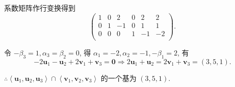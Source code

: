 \documentclass[color=black,device=normal,lang=cn,mode=geye]{elegantnote}
\begin{document}
\begin{solution}
    系数矩阵作行变换得到
    \[\begin{pmatrix}
        1 & 0 & 2  & 0 & 2  & 2 \\
        0 & 1 & -1 & 0 & 1  & 1 \\
        0 & 0 & 0  & 1 & -1 & -2 \\
    \end{pmatrix}.\]

    令 $-\beta_3=1,\alpha_3=\beta_2=0$, 得 $\alpha_1=-2,\alpha_2=-1,-\beta_1=2$, 有
    \[-2\boldsymbol{u}_1-\boldsymbol{u}_2+2\boldsymbol{v}_1+\boldsymbol{v}_3=\boldsymbol{0}\Rightarrow2\boldsymbol{u}_1+\boldsymbol{u}_2=2\boldsymbol{v}_1+\boldsymbol{v}_3=(3,5,1).\]

    $\therefore\left<\boldsymbol{u}_1,\boldsymbol{u}_2,\boldsymbol{u}_3\right>\cap\left<\boldsymbol{v}_1,\boldsymbol{v}_2,\boldsymbol{v}_3\right>$ 的一个基为 $(3,5,1)$.
\end{solution}
\end{document}
